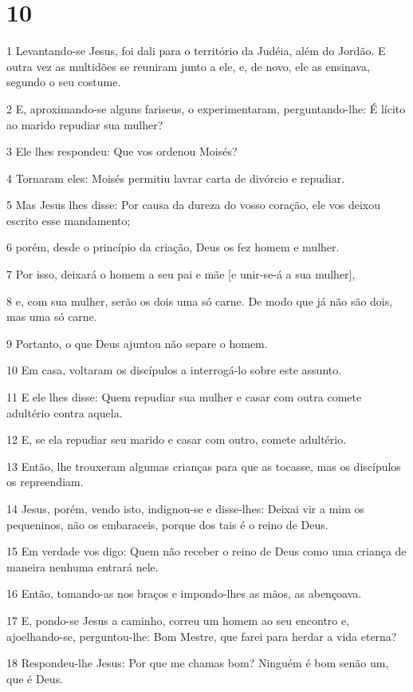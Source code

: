 \chapter{10}

\par 1 Levantando-se Jesus, foi dali para o território da Judéia, além do Jordão. E outra vez as multidões se reuniram junto a ele, e, de novo, ele as ensinava, segundo o seu costume.
\par 2 E, aproximando-se alguns fariseus, o experimentaram, perguntando-lhe: É lícito ao marido repudiar sua mulher?
\par 3 Ele lhes respondeu: Que vos ordenou Moisés?
\par 4 Tornaram eles: Moisés permitiu lavrar carta de divórcio e repudiar.
\par 5 Mas Jesus lhes disse: Por causa da dureza do vosso coração, ele vos deixou escrito esse mandamento;
\par 6 porém, desde o princípio da criação, Deus os fez homem e mulher.
\par 7 Por isso, deixará o homem a seu pai e mãe [e unir-se-á a sua mulher],
\par 8 e, com sua mulher, serão os dois uma só carne. De modo que já não são dois, mas uma só carne.
\par 9 Portanto, o que Deus ajuntou não separe o homem.
\par 10 Em casa, voltaram os discípulos a interrogá-lo sobre este assunto.
\par 11 E ele lhes disse: Quem repudiar sua mulher e casar com outra comete adultério contra aquela.
\par 12 E, se ela repudiar seu marido e casar com outro, comete adultério.
\par 13 Então, lhe trouxeram algumas crianças para que as tocasse, mas os discípulos os repreendiam.
\par 14 Jesus, porém, vendo isto, indignou-se e disse-lhes: Deixai vir a mim os pequeninos, não os embaraceis, porque dos tais é o reino de Deus.
\par 15 Em verdade vos digo: Quem não receber o reino de Deus como uma criança de maneira nenhuma entrará nele.
\par 16 Então, tomando-as nos braços e impondo-lhes as mãos, as abençoava.
\par 17 E, pondo-se Jesus a caminho, correu um homem ao seu encontro e, ajoelhando-se, perguntou-lhe: Bom Mestre, que farei para herdar a vida eterna?
\par 18 Respondeu-lhe Jesus: Por que me chamas bom? Ninguém é bom senão um, que é Deus.
